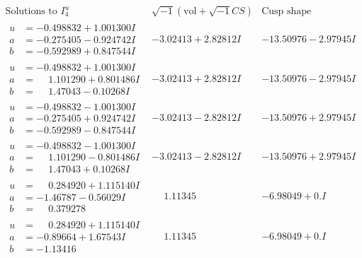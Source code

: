 \documentclass[1p]{elsarticle_modified}
\theoremstyle{definition}
\newcommand{\I}{\sqrt{-1}}
\begin{document}
$$\begin{array}{c|c|c}  
\text{Solutions to }I^u_{4}& \I (\text{vol} + \sqrt{-1}CS) & \text{Cusp shape}\\
 \hline 
\begin{aligned}
u &= -0.498832 + 1.001300 I \\
a &= -0.275405 - 0.924742 I \\
b &= -0.592989 + 0.847544 I\end{aligned}
 & -3.02413 + 2.82812 I & -13.50976 - 2.97945 I \\ \hline\begin{aligned}
u &= -0.498832 + 1.001300 I \\
a &= \phantom{-}1.101290 + 0.801486 I \\
b &= \phantom{-}1.47043 - 0.10268 I\end{aligned}
 & -3.02413 + 2.82812 I & -13.50976 - 2.97945 I \\ \hline\begin{aligned}
u &= -0.498832 - 1.001300 I \\
a &= -0.275405 + 0.924742 I \\
b &= -0.592989 - 0.847544 I\end{aligned}
 & -3.02413 - 2.82812 I & -13.50976 + 2.97945 I \\ \hline\begin{aligned}
u &= -0.498832 - 1.001300 I \\
a &= \phantom{-}1.101290 - 0.801486 I \\
b &= \phantom{-}1.47043 + 0.10268 I\end{aligned}
 & -3.02413 - 2.82812 I & -13.50976 + 2.97945 I \\ \hline\begin{aligned}
u &= \phantom{-}0.284920 + 1.115140 I \\
a &= -1.46787 - 0.56029 I \\
b &= \phantom{-}0.379278\phantom{ +0.000000I}\end{aligned}
 & \phantom{-}1.11345\phantom{ +0.000000I} & -6.98049 + 0. I\phantom{ +0.000000I} \\ \hline\begin{aligned}
u &= \phantom{-}0.284920 + 1.115140 I \\
a &= -0.89664 + 1.67543 I \\
b &= -1.13416\phantom{ +0.000000I}\end{aligned}
 & \phantom{-}1.11345\phantom{ +0.000000I} & -6.98049 + 0. I\phantom{ +0.000000I} \\ \hline\begin{aligned}

\end{aligned}
\end{array}$$
\end{document}
